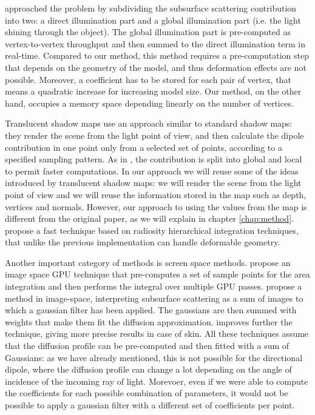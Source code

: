 \cite{Lensch:2002:IRT:826030.826632} approached the problem by subdividing the subsurface scattering contribution into two: a direct illumination part and a global illumination part (i.e. the light shining through the object). The global illumination part is pre-computed as vertex-to-vertex throughput and then summed to the direct illumination term in real-time. Compared to our method, this method requires a pre-computation step that depends on the geometry of the model, and thus deformation effects are not possible. Moreover, a coefficient has to be stored for each pair of vertex, that means a quadratic increase for increasing model size. Our method, on the other hand, occupies a memory space depending linearly on the number of vertices.

Translucent shadow maps \citep{Dachsbacher:2003:TSM:882404.882433} use an approach similar to standard shadow maps: they render the scene from the light point of view, and then calculate the dipole contribution in one point only from a selected set of points, according to a specified sampling pattern. As in \cite{Lensch:2002:IRT:826030.826632}, the contribution is split into global and local to permit faster computations. In our approach we will reuse some of the ideas introduced by translucent shadow maps: we will render the scene from the light point of view and we will reuse the information stored in the map such as depth, vertices and normals. However, our approach to using the values from the map is different from the original paper, as we will explain in chapter \ref{chap:method}. \cite{Mertens:2003:IRT:882404.882423} propose a fast technique based on radiosity hierarchical integration techniques, that unlike the previous implementation can handle deformable geometry.

Another important category of methods is screen space methods. \cite{1238246} propose an image space GPU technique that pre-computes a set of sample points for the area integration and then performs the integral over multiple GPU passes. \cite{d'Eon:2007:ERH:2383847.2383869,deonss} propose a method in image-space, interpreting subsurface scattering as a sum of images to which a gaussian filter has been applied. The gaussians are then summed with weights that make them fit the diffusion approximation. \cite{Jimenez:2009:SPR:1609967.1609970} improves further the technique, giving more precise results in case of skin. All these techniques assume that the diffusion profile can be pre-computed and then fitted with a sum of Gaussians: as we have already mentioned, this is not possible for the directional dipole, where the diffusion profile can change a lot depending on the angle of incidence of the incoming ray of light. Morevoer, even if we were able to compute the coefficients for each possible combination of parameters, it would not be possible to apply a gaussian filter with a different set of coefficients per point.

